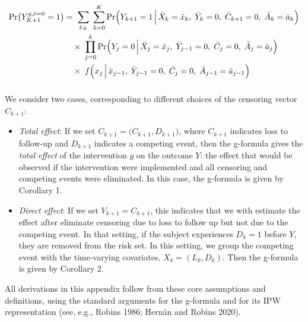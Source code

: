
\begin{align*}
  \Pr\bigl(Y_{K+1}^{g,\bar{c}=0} = 1\bigr)
  &=\;
  \sum_{\bar{x}_K}\;\sum_{k=0}^{K}
  \Pr\Bigl(Y_{k+1}=1 \,\Big|\,\bar{X}_k=\bar{x}_k,\;\bar{Y}_k=0,\;\bar{C}_{k+1}=0,\;\bar{A}_k=\bar{a}_k
  \Bigr) \\
    &\quad\times\;
    \prod_{j=0}^{k}
      \Pr\Bigl(Y_j=0 \,\Big|\,
        \bar{X}_j=\bar{x}_j,\;\bar{Y}_{j-1}=0,\;\bar{C}_j=0,\;\bar{A}_j=\bar{a}_j
      \Bigr) \\
      &\quad\times\;
      f\Bigl(x_j \,\Big|\,
        \bar{x}_{j-1},\;\bar{Y}_{j-1}=0,\;\bar{C}_j=0,\;\bar{A}_{j-1}=\bar{a}_{j-1}
        \Bigr)
  \\[6pt]
\end{align*}

We consider two cases, corresponding to different choices of the censoring vector \(C_{k+1}\):
\\
\begin{itemize}
  \item \emph{Total effect}: If we set \(C_{k+1} = \bigl(C_{k+1}, D_{k+1}\bigr)\), where \(C_{k+1}\) indicates loss to follow-up and \(D_{k+1}\) indicates a competing event, then the g-formula gives the \emph{total effect} of the intervention \(g\) on the outcome \(Y\): the effect that would be observed if the intervention were implemented and all censoring and competing events were eliminated. In this case, the g-formula is given by Corollary 1. 
          

  \item \emph{Direct effect}: If we set \(V_{k+1} = C_{k+1}\), 
        this indicates that we with estimate the effect after eliminate censoring due to loss to follow up 
        but not due to the competing event. 
        In that setting, if the subject experiences \(D_k=1\) before \(Y\), they are removed from the risk set.  
        In this setting, we group the competing event with the time-varying covariates, 
        \(X_{k} = (L_k,D_k)\). Then the g-formula is given by Corollary 2.
        

\end{itemize}


All derivations in this appendix follow from these core assumptions and definitions, using the standard arguments for the g-formula and for its IPW representation (see, e.g., Robins 1986; Hernán and Robins 2020). 